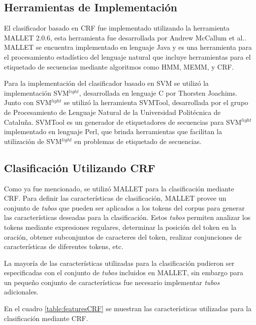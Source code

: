 \documentclass[runningheads,a4paper]{llncs}
\begin{document}
\subsection{Herramientas de Implementación}
El clasificador basado en CRF fue implementado utilizando la herramienta MALLET 2.0.6, esta herramienta fue desarrollada por Andrew McCallum et al.\cite{MCCALLUM02}. MALLET se encuentra implementado en lenguaje Java y es una herramienta para el procesamiento estadístico del lenguaje natural que incluye herramientas para el etiquetado de secuencias mediante algoritmos como HMM, MEMM, y CRF.

Para la implementaci\'on del clasificador basado en SVM se utiliz\'o la implementaci\'on SVM$^{light}$, desarrollada en lenguaje C por Thorsten Joachims\cite{JOACHIMS08}. Junto con SVM$^{light}$ se utilizó la herramienta SVMTool, desarrollada por el grupo de Procesamiento de Lenguaje Natural de la Universidad Politécnica de Cataluña\cite{GIMENEZ04}\cite{GIMENEZ06}. SVMTool es un generador de etiquetadores de secuencias para SVM$^{light}$ implementado en lenguaje Perl, que brinda herramientas que facilitan la utilizaci\'on de SVM$^{light}$ en problemas de etiquetado de secuencias. 

\subsection{Clasificación Utilizando CRF}
Como ya fue mencionado, se utilizó MALLET para la clasificación mediante CRF. Para definir las características de clasificación, MALLET provee un conjunto de \emph{tubos} que pueden ser aplicados a los tokens del corpus para generar las características deseadas para la clasificaci\'on. Estos \emph{tubos} permiten analizar los tokens mediante expresiones regulares, determinar la posición del token en la oración, obtener subconjuntos de caracteres del token, realizar conjunciones de características de diferentes tokens, etc.

La mayoría de las características utilizadas para la clasificación pudieron ser especificadas con el conjunto de \emph{tubos} incluidos en MALLET, sin embargo para un pequeño conjunto de características fue necesario implementar \emph{tubos} adicionales.

En el cuadro \ref{table:featuresCRF} se muestran las características utilizadas para la clasificación mediante CRF.
\end{document}
